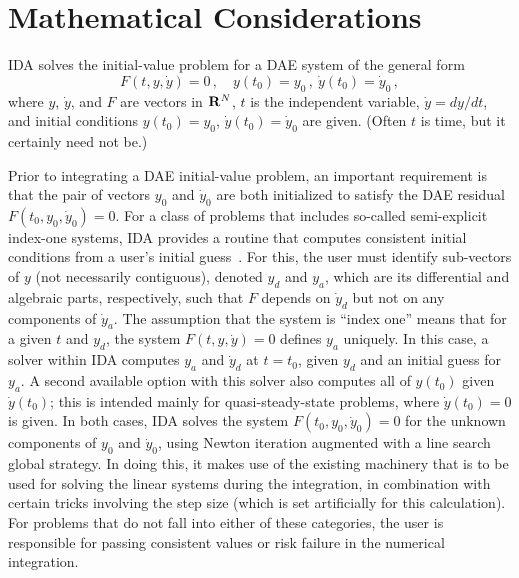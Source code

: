 \chapter{Mathematical Considerations}\label{s:math}

IDA solves the initial-value problem for 
a DAE system of the general form
\begin{equation}\label{e:DAE}
  F(t,y,{\dot y}) = 0 \, ,
  \quad y(t_0) = y_0 \, ,~ {\dot y}(t_0) = {\dot y}_0 \, ,
\end{equation}
where $y$, ${\dot y}$, and $F$ are vectors in ${\bf R}^N$, $t$ is the independent
variable, ${\dot y} = dy/dt$, 
and initial conditions $y(t_0) = y_0$, ${\dot y}(t_0) = {\dot y}_0$ 
are given.  (Often $t$ is time, but it certainly need not be.)

Prior to integrating a DAE initial-value problem, an important requirement 
is that the pair of vectors $y_0$ and ${\dot y_0}$ are both initialized to
satisfy the DAE residual $F(t_0,y_0, {\dot y}_0) = 0$.
For a class of problems that includes so-called
semi-explicit index-one systems, IDA provides a routine that computes
consistent initial conditions from a user's initial guess~\cite{BHP:98}.  
For this, the user must identify sub-vectors of $y$
(not necessarily contiguous), denoted $y_d$ and $y_a$, which are its
differential and algebraic parts, respectively, such that $F$ depends
on ${\dot y}_d$ but not on any components of ${\dot y}_a$.  The assumption that
the system is ``index one'' means that for a given $t$ and $y_d$, the
system $F(t,y,{\dot y}) = 0$ defines $y_a$ uniquely.  In this case, a solver
within IDA computes $y_a$ and ${\dot y}_d$ at $t = t_0$, given $y_d$ and an
initial guess for $y_a$.  A second available option with this solver
also computes all of $y(t_0)$ given ${\dot y}(t_0)$; this is intended mainly
for quasi-steady-state problems, where ${\dot y}(t_0) = 0$ is given.
In both cases, IDA solves the system $F(t_0,y_0, {\dot y}_0) = 0$ for the
unknown components of $y_0$ and ${\dot y}_0$, using Newton iteration
augmented with a line search global strategy.  In doing this, it makes
use of the existing machinery that is to be used for solving the
linear systems during the integration, in combination with certain
tricks involving the step size (which is set artificially for this
calculation).
For problems that do not fall into either of these categories, the
user is responsible for passing consistent values or risk failure in
the numerical integration.

